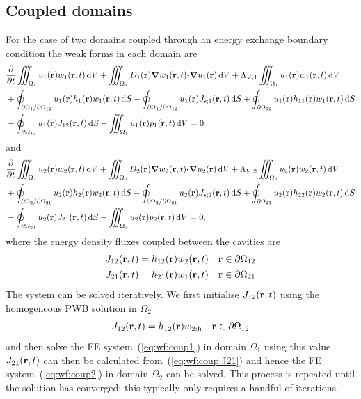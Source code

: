 \documentclass[a4paper]{article}
\numberwithin{equation}{section}
\providecommand\oiint{\oint}
\begin{document}
\subsection[Coupled domains]{Coupled domains}
\label{sc:fem:coup}

For the case of two domains coupled through an energy exchange boundary
condition the weak forms in each domain are
\begin{align}
\label{eq:wf:coup1}
&\frac{{\partial}}{{\partial}t}\iiint_{\Omega_1} u_1\pr w_1\prt\dif{V}
+\iiint_{\Omega_1} D_1\pr{\vnabla}w_1\prt{\vcdot}{\vnabla}u_1\pr\dif{V}
+\Lambda_{V;1}\iiint_{\Omega_1} u_1\pr w_1\prt\dif{V} \nonumber\\
&+\oiint_{\partial\Omega_1/\partial\Omega_{12}} u_1\pr h_1\pr w_1\prt\dif{S}
-\oiint_{\partial\Omega_1/\partial\Omega_{12}} u_1\pr J_{\rs;1}\prt\dif{S}
+\oiint_{\partial\Omega_{12}} u_1\pr h_{11}\pr w_1\prt\dif{S} \nonumber \\
&-\oiint_{\partial\Omega_{12}} u_1\pr J_{12}\prt\dif{S}
-\iiint_{\Omega_1} u_1\pr p_1\prt\dif{V}=0
\end{align}
and
\begin{align}
\label{eq:wf:coup2}
&\frac{{\partial}}{{\partial}t}\iiint_{\Omega_2} u_2\pr w_2\prt\dif{V}
+\iiint_{\Omega_2} D_2\pr{\vnabla}w_2\prt{\vcdot}{\vnabla}u_2\pr\dif{V}
+\Lambda_{V;2}\iiint_{\Omega_2} u_2\pr w_2\prt\dif{V} \nonumber\\
&+\oiint_{\partial\Omega_2/\partial\Omega_{21}} u_2\pr h_2\pr w_2\prt\dif{S}
-\oiint_{\partial\Omega_2/\partial\Omega_{21}} u_2\pr J_{s;2}\prt\dif{S}
+\oiint_{\partial\Omega_{21}} u_2\pr h_{22}\pr w_2\prt\dif{S} \nonumber\\
&-\oiint_{\partial\Omega_{21}} u_2\pr J_{21}\prt\dif{S}
-\iiint_{\Omega_2} u_2\pr p_2\prt\dif{V}=0,
\end{align}
where the energy density fluxes coupled between the cavities are
\begin{align}
\label{eq:wf:coup:J12}
\begin{matrix}
J_{12}(\boldsymbol{\mathrm{r}},t) = h_{12}(\boldsymbol{\mathrm{r}}) w_2(\boldsymbol{\mathrm{r}},t) &\boldsymbol{\mathrm{r}}\in\partial\Omega_{12} 
\end{matrix}\\
\label{eq:wf:coup:J21}
\begin{matrix}
J_{21}(\boldsymbol{\mathrm{r}},t) = h_{21}(\boldsymbol{\mathrm{r}}) w_1(\boldsymbol{\mathrm{r}},t) &\boldsymbol{\mathrm{r}}\in\partial\Omega_{21}
\end{matrix}
\end{align}
The system can be solved iteratively. We first initialise
$J_{12}(\boldsymbol{\mathrm{r}},t)$ using the homogeneous PWB solution in $\Omega_2$
\begin{align}
\begin{matrix}
J_{12}(\boldsymbol{\mathrm{r}},t) = h_{12}(\boldsymbol{\mathrm{r}}) w_{2;\mathrm{h}} &\boldsymbol{\mathrm{r}}\in\partial\Omega_{12}
\end{matrix}
\end{align}
and then solve the FE system~(\ref{eq:wf:coup1}) in domain $\Omega_1$ using
this value. $J_{21}(\boldsymbol{\mathrm{r}},t)$ can then be calculated from~(\ref{eq:wf:coup:J21}) and 
hence the FE system~(\ref{eq:wf:coup2}) in domain $\Omega_2$ can be  solved. 
This process is repeated until the solution has converged; this typically only 
requires a handful of iterations.
\end{document}
